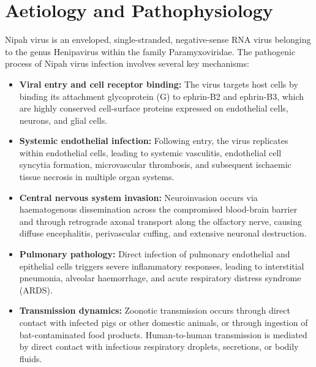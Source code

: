 \section*{Aetiology and Pathophysiology}
Nipah virus is an enveloped, single-stranded, negative-sense RNA virus belonging to the genus Henipavirus within the family Paramyxoviridae. The pathogenic process of Nipah virus infection involves several key mechanisms:
\begin{itemize}
    \item \textbf{Viral entry and cell receptor binding:} The virus targets host cells by binding its attachment glycoprotein (G) to ephrin-B2 and ephrin-B3, which are highly conserved cell-surface proteins expressed on endothelial cells, neurons, and glial cells.
    \item \textbf{Systemic endothelial infection:} Following entry, the virus replicates within endothelial cells, leading to systemic vasculitis, endothelial cell syncytia formation, microvascular thrombosis, and subsequent ischaemic tissue necrosis in multiple organ systems.
    \item \textbf{Central nervous system invasion:} Neuroinvasion occurs via haematogenous dissemination across the compromised blood-brain barrier and through retrograde axonal transport along the olfactory nerve, causing diffuse encephalitis, perivascular cuffing, and extensive neuronal destruction.
    \item \textbf{Pulmonary pathology:} Direct infection of pulmonary endothelial and epithelial cells triggers severe inflammatory responses, leading to interstitial pneumonia, alveolar haemorrhage, and acute respiratory distress syndrome (ARDS).
    \item \textbf{Transmission dynamics:} Zoonotic transmission occurs through direct contact with infected pigs or other domestic animals, or through ingestion of bat-contaminated food products. Human-to-human transmission is mediated by direct contact with infectious respiratory droplets, secretions, or bodily fluids.
\end{itemize}


